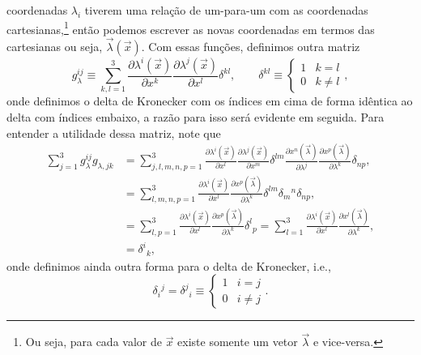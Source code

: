 coordenadas $\lambda_i$ tiverem uma relação de um-para-um com as coordenadas
cartesianas,\footnote{Ou seja, para cada valor de $\vec{x}$ existe somente um
	vetor $\vec{\lambda}$ e vice-versa.} então podemos escrever as novas coordenadas
em termos das cartesianas ou seja, $\vec{\lambda}(\vec{x})$. Com essas funções,
definimos outra matriz
\begin{equation}
	g_\lambda^{ij} \equiv \sum_{k,l=1}^3 \frac{\partial \lambda^i(\vec{x})}{\partial x^k}\frac{\partial \lambda^j(\vec{x})}{\partial x^l}\delta^{kl}, \qquad \delta^{kl} \equiv \left\{\begin{array}{cc}
		1 & k=l     \\
		0 & k\neq l
	\end{array}\right.,
\end{equation}
onde definimos o delta de Kronecker com os índices em cima de forma idêntica ao
delta com índices embaixo, a razão para isso será evidente em seguida. Para
entender a utilidade dessa matriz, note que
\begin{align}
	\nonumber \sum_{j=1}^3g_\lambda^{ij}g_{\lambda,jk} & =  \sum_{j,l,m,n,p=1}^3 \frac{\partial \lambda^i(\vec{x})}{\partial x^l}\frac{\partial \lambda^j(\vec{x})}{\partial x^m}\delta^{lm} \frac{\partial x^n(\vec{\lambda})}{\partial \lambda^j}\frac{\partial x^p(\vec{\lambda})}{\partial \lambda^k}\delta_{np} , \\
	\nonumber                                          & = \sum_{l,m,n,p=1}^3 \frac{\partial \lambda^i(\vec{x})}{\partial x^l} \frac{\partial x^p(\vec{\lambda})}{\partial \lambda^k}\delta^{lm}\delta_m{}^n\delta_{np},                                                                                               \\
	\nonumber                                          & = \sum_{l,p=1}^3 \frac{\partial \lambda^i(\vec{x})}{\partial x^l} \frac{\partial x^p(\vec{\lambda})}{\partial \lambda^k}\delta^l{}_p = \sum_{l=1}^3 \frac{\partial \lambda^i(\vec{x})}{\partial x^l} \frac{\partial x^l(\vec{\lambda})}{\partial \lambda^k},  \\
	                                                   & = \delta^i{}_k,
\end{align}
onde definimos ainda outra forma para o delta de Kronecker, i.e.,
\begin{equation}
	\delta_i{}^j =\delta^j{}_i \equiv \left\{\begin{array}{cc}
		1 & i=j     \\
		0 & i\neq j
	\end{array}\right..
\end{equation}
